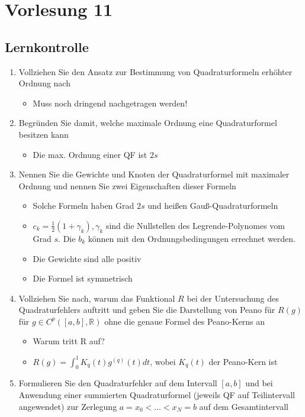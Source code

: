 \documentclass[]{article}
\newcommand*{\real}{\ensuremath{\mathbb{R}}}
\begin{document}
\section{Vorlesung 11}
\subsection{Lernkontrolle}
	\begin{enumerate}
		\item Vollziehen Sie den Ansatz zur Bestimmung von Quadraturformeln erhöhter Ordnung nach
			\begin{itemize}
				\item Muss noch dringend nachgetragen werden! %
			\end{itemize}
		\item Begründen Sie damit, welche maximale Ordnung eine Quadraturformel besitzen kann
			\begin{itemize}
				\item Die max. Ordnung einer QF ist $2s$
			\end{itemize}
		\item Nennen Sie die Gewichte und Knoten der Quadraturformel mit maximaler Ordnung und nennen Sie zwei Eigenschaften dieser Formeln
			\begin{itemize}
				\item Solche Formeln haben Grad $2s$ und heißen Gauß-Quadraturformeln
				\item $c_k = \frac{1}{2}(1 + \gamma_k), \gamma_k$ sind die Nullstellen des Legrende-Polynomes vom Grad $s$. Die $b_k$ können mit den Ordnungsbedingungen errechnet werden.
				\item Die Gewichte sind alle positiv
				\item Die Formel ist symmetrisch
			\end{itemize}
		\item Vollziehen Sie nach, warum das Funktional $R$ bei der Untersuchung des Quadraturfehlers auftritt und geben Sie die Darstellung von Peano für $R(g)$ für $g \in C^p([a,b], \real)$ ohne die genaue Formel des Peano-Kerns an
			\begin{itemize}
				\item Warum tritt R auf? %
				\item $R(g) = \int_0^1 K_q(t) g^{(q)}(t) dt$, wobei $K_q(t)$ der Peano-Kern ist
			\end{itemize}
		\item Formulieren Sie den Quadraturfehler auf dem Intervall $[a,b]$ und bei Anwendung einer summierten Quadraturformel (jeweils QF auf Teilintervall angewendet) zur Zerlegung $a = x_0 < \dots < x_N = b$ auf dem Gesamtintervall

\end{enumerate}
\end{document}
